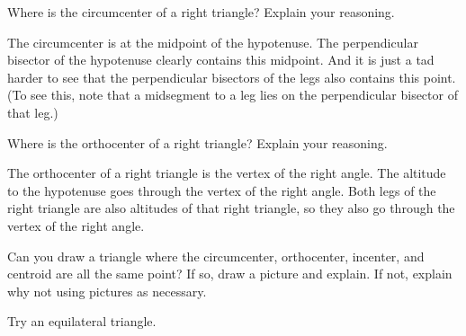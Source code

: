 \documentclass[nooutcomes]{ximera}
\begin{document}
\begin{problem}
Where is the circumcenter of a right triangle? Explain your
  reasoning.
\begin{freeResponse}
\begin{hint}
The circumcenter is at the midpoint of the hypotenuse.  The perpendicular bisector of the hypotenuse clearly contains this midpoint.  And it is just a tad harder to see that the perpendicular bisectors of the legs also contains this point.  (To see this, note that a midsegment to a leg lies on the perpendicular bisector of that leg.)
\end{hint}
\end{freeResponse}
\end{problem}

\begin{problem}
Where is the orthocenter of a right triangle? Explain your
  reasoning.
\begin{freeResponse}
\begin{hint}
The orthocenter of a right triangle is the vertex of the right angle.  The altitude to the hypotenuse goes through the vertex of the right angle.  Both legs of the right triangle are also altitudes of that right triangle, so they also go through the vertex of the right angle.  
\end{hint}
\end{freeResponse}
\end{problem}

\begin{problem}
Can you draw a triangle where the circumcenter, orthocenter,
  incenter, and centroid are all the same point?  If so, draw a
  picture and explain. If not, explain why not using pictures as
  necessary.
\begin{freeResponse}
\begin{hint}
Try an equilateral triangle.  
\end{hint}
\end{freeResponse}
\end{problem}
\end{document}
